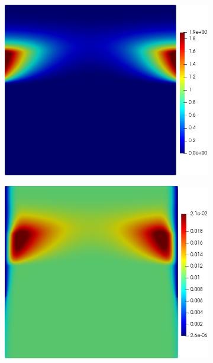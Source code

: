 \documentclass[11pt]{article}
\numberwithin{equation}{section}
\begin{document}
 \begin{figure}[h]
     \centering
     \begin{subfigure}[t]{0.31\textwidth}
     \includegraphics[width=\textwidth]{Figures/testpics/IncreasedBufferAndDistancedDMA24.png}
     \caption{}
     \label{fig:Fwup_DMA}
     \end{subfigure}
     \begin{subfigure}[t]{0.31\textwidth}
     \includegraphics[width=\textwidth]{Figures/testpics/IncreasedBufferAndDistanceZn24.png}

\end{subfigure}
\end{figure}
\end{document}
